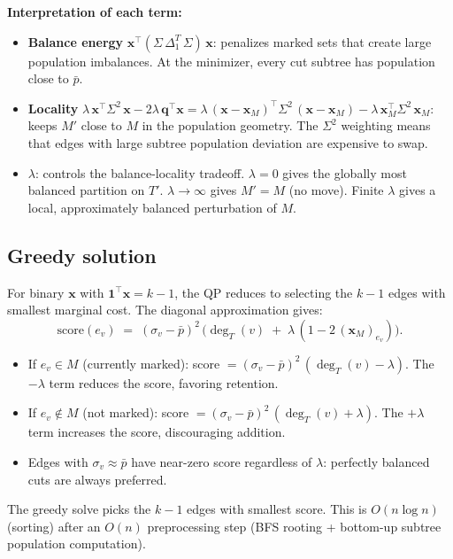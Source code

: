 \documentclass[11pt]{article}
\newcommand{\pbar}{\bar{p}}
\begin{document}
\medskip
\noindent\textbf{Interpretation of each term:}
\begin{itemize}
\item \textbf{Balance energy} $\mathbf{x}^\top (\Sigma\, \Delta_1^T\, \Sigma)\, \mathbf{x}$: penalizes marked sets that create large population imbalances. At the minimizer, every cut subtree has population close to $\pbar$.
\item \textbf{Locality} $\lambda\, \mathbf{x}^\top \Sigma^2\, \mathbf{x} - 2\lambda\, \mathbf{q}^\top \mathbf{x} = \lambda\, (\mathbf{x} - \mathbf{x}_M)^\top \Sigma^2\, (\mathbf{x} - \mathbf{x}_M) - \lambda\, \mathbf{x}_M^\top \Sigma^2\, \mathbf{x}_M$: keeps $M'$ close to $M$ in the population geometry. The $\Sigma^2$ weighting means that edges with large subtree population deviation are expensive to swap.
\item \textbf{$\lambda$}: controls the balance-locality tradeoff. $\lambda = 0$ gives the globally most balanced partition on $T'$. $\lambda \to \infty$ gives $M' = M$ (no move). Finite $\lambda$ gives a local, approximately balanced perturbation of $M$.
\end{itemize}

\subsection{Greedy solution}

For binary $\mathbf{x}$ with $\mathbf{1}^\top \mathbf{x} = k-1$, the QP reduces to selecting the $k-1$ edges with smallest marginal cost. The diagonal approximation gives:
\begin{equation}\label{eq:score}
\mathrm{score}(e_v) \;=\; (\sigma_v - \pbar)^2 \,\bigl(\deg_T(v) \;+\; \lambda\,(1 - 2\,(\mathbf{x}_M)_{e_v})\bigr).
\end{equation}
\begin{itemize}
\item If $e_v \in M$ (currently marked): score $= (\sigma_v - \pbar)^2\,(\deg_T(v) - \lambda)$. The $-\lambda$ term reduces the score, favoring retention.
\item If $e_v \notin M$ (not marked): score $= (\sigma_v - \pbar)^2\,(\deg_T(v) + \lambda)$. The $+\lambda$ term increases the score, discouraging addition.
\item Edges with $\sigma_v \approx \pbar$ have near-zero score regardless of $\lambda$: perfectly balanced cuts are always preferred.
\end{itemize}

The greedy solve picks the $k-1$ edges with smallest score. This is $O(n \log n)$ (sorting) after an $O(n)$ preprocessing step (BFS rooting + bottom-up subtree population computation).
\end{document}
